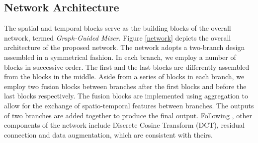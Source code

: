 \documentclass[10pt,twocolumn,letterpaper]{article}
\begin{document}
    
\subsection{Network Architecture}

The spatial and temporal blocks serve as the building blocks of the overall network, termed \textit{Graph-Guided Mixer}.
Figure \ref{network} depicts the overall architecture of the proposed network.
The network adopts a two-branch design assembled in a symmetrical fashion.
In each branch, we employ a number  of blocks in successive order. The first and the last blocks are differently assembled from the blocks in the middle.
Aside from a series of blocks in each branch, we employ two fusion blocks between branches after the first blocks and before the last blocks respectively. 
The fusion blocks are implemented using aggregation to allow for the exchange of spatio-temporal features between branches.
The outputs of two branches are added together to produce the final output.
Following \cite{guo2023back}, other components of the network include Discrete Cosine Transform (DCT), residual connection and data augmentation, which are consistent with theirs.
\end{document}
